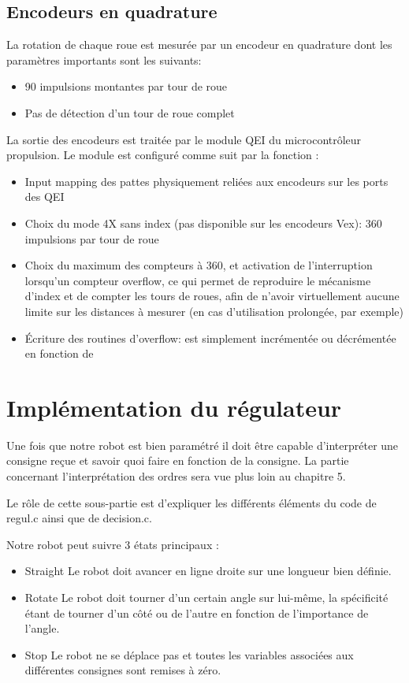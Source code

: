 \subsection{Encodeurs en quadrature}
La rotation de chaque roue est mesurée par un encodeur en quadrature dont les paramètres importants sont les suivants:
\begin{itemize}
  \item 90 impulsions montantes par tour de roue
  \item Pas de détection d'un tour de roue complet
\end{itemize}
La sortie des encodeurs est traitée par le module QEI du microcontrôleur propulsion. Le module est configuré comme suit par la fonction :
\begin{itemize}
  \item Input mapping des pattes physiquement reliées aux encodeurs sur les ports des QEI
  \item Choix du mode 4X sans index (pas disponible sur les encodeurs Vex): 360 impulsions par tour de roue
  \item Choix du maximum des compteurs à 360, et activation de l'interruption lorsqu'un compteur overflow, ce qui permet de reproduire le mécanisme d'index et de compter les tours de roues, afin de n'avoir virtuellement aucune limite sur les distances à mesurer (en cas d'utilisation prolongée, par exemple)
  \item \'Ecriture des routines d'overflow:  est simplement incrémentée ou décrémentée en fonction de 
\end{itemize}

\section{Implémentation du régulateur}

Une fois que notre robot est bien paramétré il doit être capable d'interpréter une consigne reçue et savoir quoi faire en fonction de la consigne. La partie concernant l'interprétation des ordres sera vue plus loin au chapitre 5.

Le rôle de cette sous-partie est d'expliquer les différents éléments du code de regul.c ainsi que de decision.c.

Notre robot peut suivre 3 états principaux :

\begin{itemize}
\item Straight
Le robot doit avancer en ligne droite sur une longueur bien définie.
\item Rotate
Le robot doit tourner d'un certain angle sur lui-même, la spécificité étant de tourner d'un côté ou de l'autre en fonction de l'importance de l'angle.
\item Stop
Le robot ne se déplace pas et toutes les variables associées aux différentes consignes sont remises à zéro.
\end{itemize}
